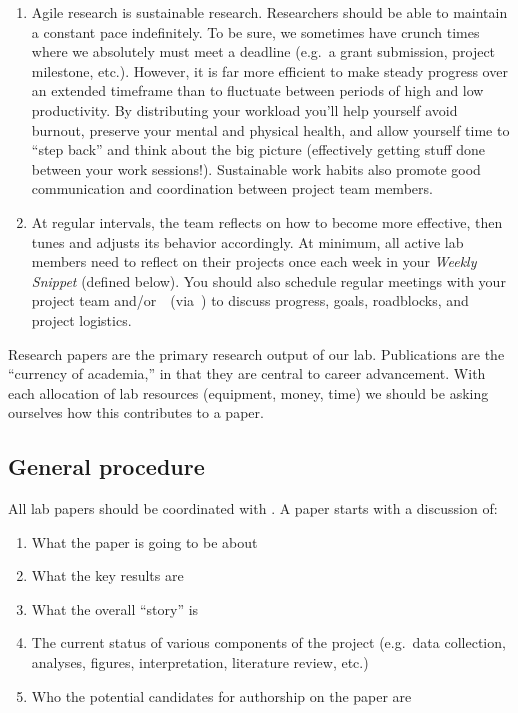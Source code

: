 \documentclass{tufte-book} %
\begin{document}
\begin{enumerate}
\item Agile research is sustainable research.  Researchers should be
  able to maintain a constant pace indefinitely.  To be sure, we
  sometimes have crunch times where we absolutely must meet a deadline
  (e.g.\ a grant submission, project milestone, etc.).  However, it is
  far more efficient to make steady progress over an extended
  timeframe than to fluctuate between periods of high and low
  productivity.  By distributing your workload you'll help yourself
  avoid burnout, preserve your mental and physical health, and allow
  yourself time to ``step back'' and think about the big picture
  (effectively getting stuff done between your work sessions!).
  Sustainable work habits also promote good communication and
  coordination between project team members.

\item At regular intervals, the team reflects on how to become more effective,
then tunes and adjusts its behavior accordingly. At minimum, all active lab
members need to reflect on their projects once each week in your \textit{Weekly
Snippet} (defined below). You should also schedule regular meetings with your
project team and/or~\director~(via~\meeting) to discuss progress, goals,
roadblocks, and project logistics. 

\end{enumerate}


\noindent Research papers are the primary research output of our lab.
Publications are the ``currency of academia,'' in that they are
central to career advancement.  With each allocation of lab resources
(equipment, money, time) we should be asking ourselves how this
contributes to a paper.

\subsection{General procedure}
All lab papers should be coordinated with \director.  A paper starts
with a discussion of:
\begin{enumerate}
\item What the paper is going to be about
\item What the key results are
\item What the overall ``story'' is
\item The current status of various components of the project
  (e.g.\ data collection, analyses, figures, interpretation,
  literature review, etc.)
\item Who the potential candidates for authorship on the paper are
\end{enumerate}
\end{document}
